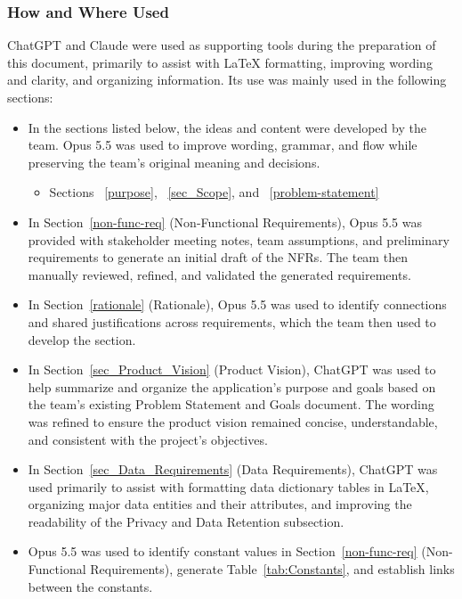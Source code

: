 \documentclass[12pt]{article}
\begin{document}
\subsubsection*{How and Where Used}

ChatGPT and Claude were used as supporting tools during the preparation of
this document, primarily to assist with \LaTeX{} formatting,
improving wording and clarity, and organizing information.
Its use was mainly used in the following sections:

\begin{itemize}
    \item In the sections listed below, the ideas and content
    were developed by the team. Opus 5.5 was used to improve wording,
    grammar, and flow while preserving the team's original meaning and decisions.

    \begin{itemize}
        \item Sections ~\ref{purpose}, ~\ref{sec_Scope}, and ~\ref{problem-statement}
    \end{itemize}

    \item In Section~\ref{non-func-req} (Non-Functional Requirements), Opus 5.5 was
    provided with stakeholder meeting notes, team assumptions, and preliminary requirements
    to generate an initial draft of the NFRs. The team then manually reviewed, refined,
    and validated the generated requirements.

    \item In Section~\ref{rationale} (Rationale), Opus 5.5 was used to identify connections
    and shared justifications across requirements, which the team then used to develop the section.

    \item In Section~\ref{sec_Product_Vision} (Product Vision),
    ChatGPT was used to help summarize and organize the
    application's purpose and goals based on the team's
    existing Problem Statement and Goals document.
    The wording was refined to ensure the product vision
    remained concise, understandable, and consistent
    with the project's objectives.

    \item In Section~\ref{sec_Data_Requirements} (Data Requirements),
    ChatGPT was used primarily to assist with formatting
    data dictionary tables in \LaTeX{}, organizing major
    data entities and their attributes, and improving
    the readability of the Privacy and Data Retention
    subsection.

    \item Opus 5.5 was used to identify constant values in Section~\ref{non-func-req} (Non-Functional Requirements),
    generate Table~\ref{tab:Constants}, and establish links between the constants.
\end{itemize}
\end{document}
